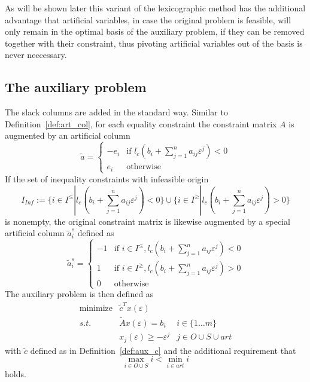 \documentclass[a4paper]{article}
\begin{document}
As will be shown later this variant of the lexicographic method has the
additional
advantage that artificial variables,  in case the original problem is feasible,
will only remain in the optimal basis of the
auxiliary problem, if they can be
removed together with their constraint, thus
pivoting artificial variables out of the basis is never neccessary.
  
\subsection{The auxiliary problem}
The slack columns are added in the standard way.
Similar to Definition~\ref{def:art_col}, for each equality constraint the constraint
matrix $A$ is augmented by an artificial column
\[
 \tilde{a} =  \left\{
	        \begin{array}{ll}
  		  -e_{i} &
		    \mbox{if $l_{c}\left(
		      b_{i} + \sum_{j=1}^{n}a_{ij}\varepsilon^{j}\right)< 0$}\\
		   e_{i}  & \mbox{otherwise}
	        \end{array}
 	       \right.
\]
If the set of inequality constraints with infeasible origin
\[
  I_{Inf}:=\{i \in I^{\leq}\left|\right. l_{c}\left(b_{i} +
    \sum_{j=1}^{n}a_{ij}\varepsilon^{j}\right) < 0\} \cup
    \{i \in I^{\geq}\left|\right. l_{c}\left(b_{i} +
    \sum_{j=1}^{n}a_{ij}\varepsilon^{j}\right) > 0\}
\]
is nonempty, the original constraint matrix is likewise augmented by a special
artificial column $\tilde{a}_{i}^{s}$ defined as
\[
  \tilde{a}^{s}_{i} =  \left\{
	                 \begin{array}{ll}
  		           -1 & \mbox{if $i \in I^{\leq},
			    l_{c}\left(b_{i} +
			     \sum_{j=1}^{n}a_{ij}\varepsilon^{j}\right) < 0$}\\
		            1 & \mbox{if $i \in I^{\geq},
			    l_{c}\left(b_{i} +
			      \sum_{j=1}^{n}a_{ij}\varepsilon^{j}\right)> 0$}\\
		            0 & \mbox{otherwise}
	                 \end{array}
 	               \right.
\]
The auxiliary problem is then defined as
\begin{eqnarray}
\label{def:aux_prob}
 \mbox{minimize} &  \tilde{c}^{T}x(\varepsilon)   & 	  \nonumber \\
	s.t.	 & \tilde{A}x(\varepsilon) = b_{i} & i \in \{1 \ldots m \}   \\
		 & x_{j}(\varepsilon) \geq -\varepsilon^{j} &
		   j \in O \cup S \cup art \nonumber 
\end{eqnarray}
with $\tilde{c}$ defined as in Definition~\ref{def:aux_c} and the additional
requirement that 
\begin{equation}
\label{req:order_eps}
\max_{i \in O \cup S}i < \min_{i \in art}i
\end{equation} 
holds.
\end{document}
